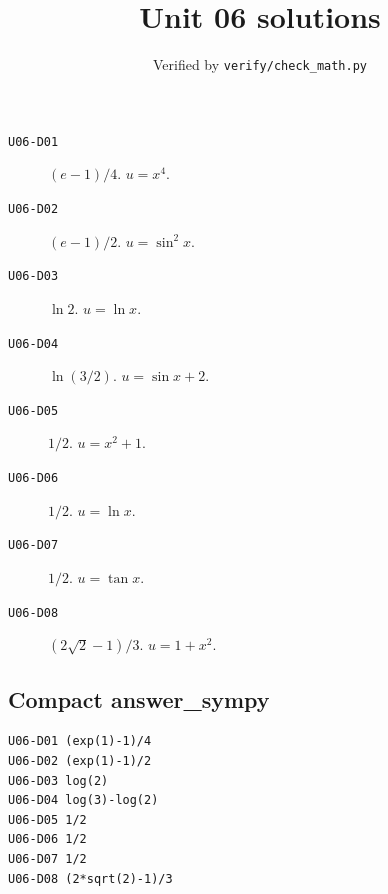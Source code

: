 
\title{Unit 06 solutions}
\author{Verified by \texttt{verify/check\_math.py}}
\date{}

\maketitle
\begin{description}
\item[\texttt{U06-D01}] \((e-1)/4\). $u=x^4$.
\item[\texttt{U06-D02}] \((e-1)/2\). $u=\sin^2 x$.
\item[\texttt{U06-D03}] \(\ln 2\). $u=\ln x$.
\item[\texttt{U06-D04}] \(\ln(3/2)\). $u=\sin x+2$.
\item[\texttt{U06-D05}] \(1/2\). $u=x^2+1$.
\item[\texttt{U06-D06}] \(1/2\). $u=\ln x$.
\item[\texttt{U06-D07}] \(1/2\). $u=\tan x$.
\item[\texttt{U06-D08}] \((2\sqrt{2}-1)/3\). $u=1+x^2$.
\end{description}
\subsection*{Compact answer\_sympy}
\begin{verbatim}
U06-D01 (exp(1)-1)/4
U06-D02 (exp(1)-1)/2
U06-D03 log(2)
U06-D04 log(3)-log(2)
U06-D05 1/2
U06-D06 1/2
U06-D07 1/2
U06-D08 (2*sqrt(2)-1)/3
\end{verbatim}

